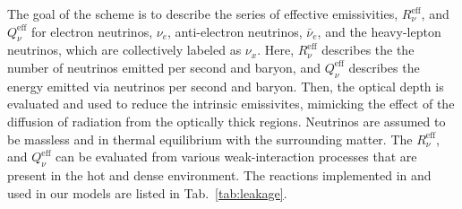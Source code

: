 %
The goal of the scheme is to describe the series of effective emissivities, 
$R_{\nu}^{\text{eff}}$, and $Q_{\nu}^{\text{eff}}$ for electron neutrinos, $\nu_e$, 
anti-electron neutrinos, $\bar{\nu}_e$, and the heavy-lepton neutrinos, 
which are collectively labeled as $\nu_x$.
%
Here, $R_{\nu}^{\text{eff}}$ describes the the number of neutrinos emitted per second and baryon,
and $Q_{\nu}^{\text{eff}}$ describes the energy emitted via neutrinos per second and baryon.
%
Then, the optical depth is evaluated and used to reduce the intrinsic emissivites, 
mimicking the effect of the diffusion of radiation from the optically thick regions.
%
%
Neutrinos are assumed to be massless and in thermal equilibrium with the surrounding matter.
%
%
The $R_{\nu}^{\text{eff}}$, and $Q_{\nu}^{\text{eff}}$ can be evaluated from various 
weak-interaction processes that are present in the hot and dense \pmerg{} environment. 
%
The reactions implemented in \wisky{} and used in our models are 
listed in Tab.~\ref{tab:leakage}. 
%

